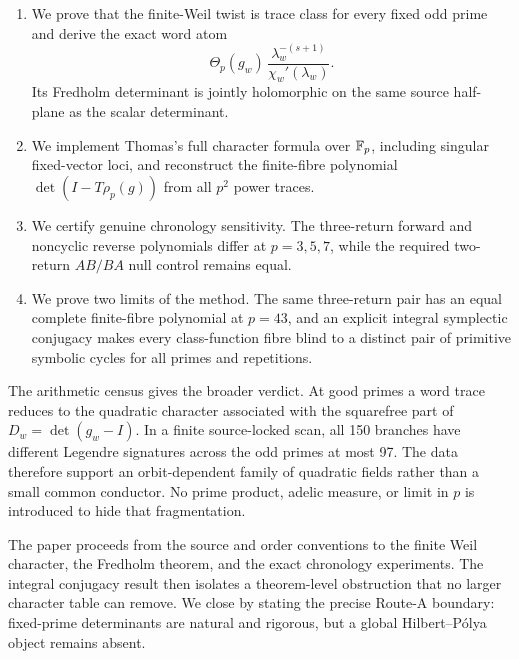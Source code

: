 \begin{enumerate}[leftmargin=2.1em,label=(\roman*)]
\item We prove that the finite-Weil twist is trace class for every fixed odd
  prime and derive the exact word atom
  \[
  \Theta_p(g_w)\,
  \frac{\lambda_w^{-(s+1)}}{\chi_w'(\lambda_w)}.
  \]
  Its Fredholm determinant is jointly holomorphic on the same source
  half-plane as the scalar determinant.
\item We implement Thomas's full character formula over \(\mathbb{F}_p\), including
  singular fixed-vector loci, and reconstruct the finite-fibre polynomial
  \(\det(I-T\rho_p(g))\) from all \(p^2\) power traces.
\item We certify genuine chronology sensitivity.  The three-return forward
  and noncyclic reverse polynomials differ at \(p=3,5,7\), while the required
  two-return \(AB/BA\) null control remains equal.
\item We prove two limits of the method.  The same three-return pair has an
  equal complete finite-fibre polynomial at \(p=43\), and an explicit
  integral symplectic conjugacy makes every class-function fibre blind to a
  distinct pair of primitive symbolic cycles for all primes and repetitions.
\end{enumerate}

The arithmetic census gives the broader verdict.  At good primes a word
trace reduces to the quadratic character associated with the squarefree part
of \(D_w=\det(g_w-I)\).  In a finite source-locked scan, all 150 branches have
different Legendre signatures across the odd primes at most 97.  The data
therefore support an orbit-dependent family of quadratic fields rather than
a small common conductor.  No prime product, adelic measure, or limit in
\(p\) is introduced to hide that fragmentation.

The paper proceeds from the source and order conventions to the finite Weil
character, the Fredholm theorem, and the exact chronology experiments.  The
integral conjugacy result then isolates a theorem-level obstruction that no
larger character table can remove.  We close by stating the precise
Route-A boundary: fixed-prime determinants are natural and rigorous, but a
global Hilbert--P\'olya object remains absent.
